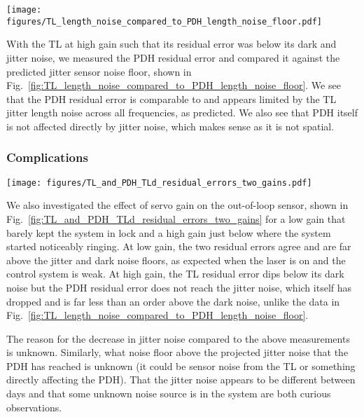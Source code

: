 \documentclass[aps,pra,superscriptaddress,reprint,nofootinbib]{revtex4-1}
\begin{document}
\begin{figure*}
	\texttt{[image: figures/TL\_length\_noise\_compared\_to\_PDH\_length\_noise\_floor.pdf]}
	\caption{SR785 LF measurements from 2021-01 of TL and PDH dark and jitter noise projected into length noise using the error signal slopes. Comparing to projected PDH residual error noise floor at high gain, with normalised DC voltage.}
	\label{fig:TL_length_noise_compared_to_PDH_length_noise_floor}
\end{figure*}

With the TL at high gain such that its residual error was below its dark and jitter noise, we measured the PDH residual error and compared it against the predicted jitter sensor noise floor, shown in Fig.~\ref{fig:TL_length_noise_compared_to_PDH_length_noise_floor}. We see that the PDH residual error is comparable to and appears limited by the TL jitter length noise across all frequencies, as predicted. We also see that PDH itself is not affected directly by jitter noise, which makes sense as it is not spatial.

\subsubsection{Complications}

\begin{figure*}
	\texttt{[image: figures/TL\_and\_PDH\_TLd\_residual\_errors\_two\_gains.pdf]}
	\caption{SR785 LF measurements from 2021-01-20 of TL and PDH dark and jitter noise projected into length noise. Compared against high and low gain residual errors.}
	\label{fig:TL_and_PDH_TLd_residual_errors_two_gains}
\end{figure*}

We also investigated the effect of servo gain on the out-of-loop sensor, shown in Fig.~\ref{fig:TL_and_PDH_TLd_residual_errors_two_gains} for a low gain that barely kept the system in lock and a high gain just below where the system started noticeably ringing. At low gain, the two residual errors agree and are far above the jitter and dark noise floors, as expected when the laser is on and the control system is weak. At high gain, the TL residual error dips below its dark noise but the PDH residual error does not reach the jitter noise, which itself has dropped and is far less than an order above the dark noise, unlike the data in Fig.~\ref{fig:TL_length_noise_compared_to_PDH_length_noise_floor}.

The reason for the decrease in jitter noise compared to the above measurements is unknown. Similarly, what noise floor above the projected jitter noise that the PDH has reached is unknown (it could be sensor noise from the TL or something directly affecting the PDH). That the jitter noise appears to be different between days and that some unknown noise source is in the system are both curious observations.
\end{document}

